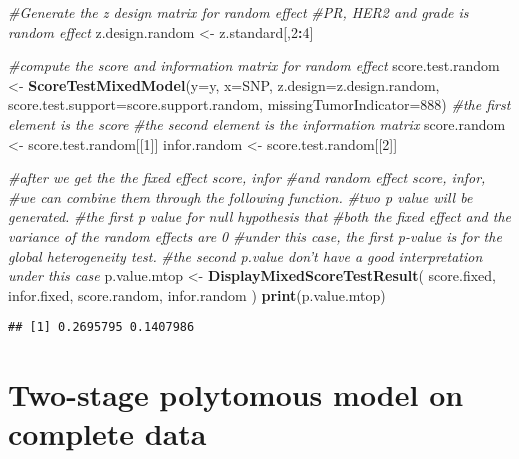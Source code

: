 \documentclass[11pt,]{article}
\newenvironment{Shaded}{\begin{snugshade}}{\end{snugshade}}
\newcommand{\CommentTok}[1]{\textcolor[rgb]{0.56,0.35,0.01}{\textit{#1}}}
\newcommand{\DataTypeTok}[1]{\textcolor[rgb]{0.13,0.29,0.53}{#1}}
\newcommand{\DecValTok}[1]{\textcolor[rgb]{0.00,0.00,0.81}{#1}}
\newcommand{\KeywordTok}[1]{\textcolor[rgb]{0.13,0.29,0.53}{\textbf{#1}}}
\newcommand{\NormalTok}[1]{#1}
\newcommand{\OperatorTok}[1]{\textcolor[rgb]{0.81,0.36,0.00}{\textbf{#1}}}
\newcommand{\StringTok}[1]{\textcolor[rgb]{0.31,0.60,0.02}{#1}}
\begin{document}
\begin{Shaded}
\begin{Highlighting}[]
\CommentTok{#Generate the z design matrix for random effect}
\CommentTok{#PR, HER2 and grade is random effect}
\NormalTok{z.design.random <-}\StringTok{ }\NormalTok{z.standard[,}\DecValTok{2}\OperatorTok{:}\DecValTok{4}\NormalTok{]}

\CommentTok{#compute the score and information matrix for random effect}
\NormalTok{score.test.random <-}\StringTok{ }\KeywordTok{ScoreTestMixedModel}\NormalTok{(}\DataTypeTok{y=}\NormalTok{y,}
                                         \DataTypeTok{x=}\NormalTok{SNP,}
                                         \DataTypeTok{z.design=}\NormalTok{z.design.random,}
                                         \DataTypeTok{score.test.support=}\NormalTok{score.support.random,}
                                         \DataTypeTok{missingTumorIndicator=}\DecValTok{888}\NormalTok{)}
\CommentTok{#the first element is the score}
\CommentTok{#the second element is the information matrix}
\NormalTok{score.random <-}\StringTok{ }\NormalTok{score.test.random[[}\DecValTok{1}\NormalTok{]]}
\NormalTok{infor.random <-}\StringTok{ }\NormalTok{score.test.random[[}\DecValTok{2}\NormalTok{]]}

\CommentTok{#after we get the the fixed effect score, infor }
\CommentTok{#and random effect score, infor, }
\CommentTok{#we can combine them through the following function. }
\CommentTok{#two p value will be generated.}
\CommentTok{#the first p value for null hypothesis that}
\CommentTok{#both the fixed effect and the variance of the random effects are 0}
\CommentTok{#under this case, the first p-value is for the global heterogeneity test.}
\CommentTok{#the second p.value don't have a good interpretation under this case}
\NormalTok{p.value.mtop <-}\StringTok{ }\KeywordTok{DisplayMixedScoreTestResult}\NormalTok{(}
\NormalTok{  score.fixed,}
\NormalTok{  infor.fixed,}
\NormalTok{  score.random,}
\NormalTok{  infor.random}
\NormalTok{)  }
\KeywordTok{print}\NormalTok{(p.value.mtop)}
\end{Highlighting}
\end{Shaded}

\begin{verbatim}
## [1] 0.2695795 0.1407986
\end{verbatim}

\hypertarget{two-stage-polytomous-model-on-complete-data}{%
\section{Two-stage polytomous model on complete
data}\label{two-stage-polytomous-model-on-complete-data}}
\end{document}
